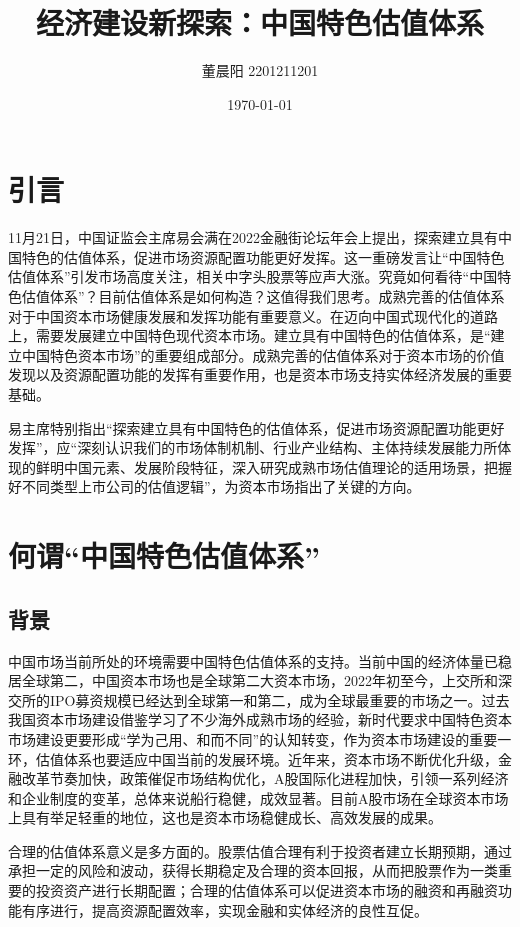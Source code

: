 \documentclass{ctexart}
\author{董晨阳 2201211201}
\title{经济建设新探索：中国特色估值体系}
\date{\today}
\begin{document}
\maketitle
\section*{引言}
11月21日，中国证监会主席易会满在2022金融街论坛年会上提出，探索建立具有中国特色的估值体系，促进市场资源配置功能更好发挥。这一重磅发言让“中国特色估值体系”引发市场高度关注，相关中字头股票等应声大涨。究竟如何看待“中国特色估值体系”？目前估值体系是如何构造？这值得我们思考。成熟完善的估值体系对于中国资本市场健康发展和发挥功能有重要意义。在迈向中国式现代化的道路上，需要发展建立中国特色现代资本市场。建立具有中国特色的估值体系，是“建立中国特色资本市场”的重要组成部分。成熟完善的估值体系对于资本市场的价值发现以及资源配置功能的发挥有重要作用，也是资本市场支持实体经济发展的重要基础。

易主席特别指出“探索建立具有中国特色的估值体系，促进市场资源配置功能更好发挥”，应“深刻认识我们的市场体制机制、行业产业结构、主体持续发展能力所体现的鲜明中国元素、发展阶段特征，深入研究成熟市场估值理论的适用场景，把握好不同类型上市公司的估值逻辑”，为资本市场指出了关键的方向。
\section*{何谓“中国特色估值体系”}

\subsection*{背景}
中国市场当前所处的环境需要中国特色估值体系的支持。当前中国的经济体量已稳居全球第二，中国资本市场也是全球第二大资本市场，2022年初至今，上交所和深交所的IPO募资规模已经达到全球第一和第二，成为全球最重要的市场之一。过去我国资本市场建设借鉴学习了不少海外成熟市场的经验，新时代要求中国特色资本市场建设更要形成“学为己用、和而不同”的认知转变，作为资本市场建设的重要一环，估值体系也要适应中国当前的发展环境。近年来，资本市场不断优化升级，金融改革节奏加快，政策催促市场结构优化，A股国际化进程加快，引领一系列经济和企业制度的变革，总体来说船行稳健，成效显著。目前A股市场在全球资本市场上具有举足轻重的地位，这也是资本市场稳健成长、高效发展的成果。

合理的估值体系意义是多方面的。股票估值合理有利于投资者建立长期预期，通过承担一定的风险和波动，获得长期稳定及合理的资本回报，从而把股票作为一类重要的投资资产进行长期配置；合理的估值体系可以促进资本市场的融资和再融资功能有序进行，提高资源配置效率，实现金融和实体经济的良性互促。
\end{document}
